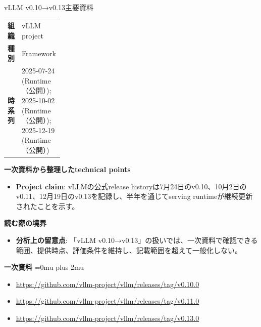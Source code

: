 \begin{technicalnote}{vLLM v0.10→v0.13}{主要資料}
\begingroup
\begin{tabularx}{\linewidth}{@{}>{\bfseries}p{0.22\linewidth}X@{}}
組織 & vLLM project \\
種別 & Framework \\
時系列 & 2025-07-24 (Runtime（公開）); 2025-10-02 (Runtime（公開）); 2025-12-19 (Runtime（公開）) \\
\end{tabularx}
\smallskip
{\bfseries 一次資料から整理したtechnical points}
\begin{itemize}[leftmargin=1.5em,itemsep=0.35em]
\item \textbf{Project claim}: vLLMの公式release historyは7月24日のv0.10、10月2日のv0.11、12月19日のv0.13を記録し、半年を通じてserving runtimeが継続更新されたことを示す。
\end{itemize}
\begin{minipage}{\linewidth}
{\bfseries 読む際の境界}
\begin{itemize}[leftmargin=1.5em,itemsep=0.35em]
\item \textbf{分析上の留意点}: 「vLLM v0.10→v0.13」の扱いでは、一次資料で確認できる範囲、提供時点、評価条件を維持し、記載範囲を超えて一般化しない。
\end{itemize}
\begin{samepage}
{\bfseries 一次資料}
\begingroup\sloppy
\Urlmuskip=0mu plus 2mu\relax
\begin{itemize}[leftmargin=1.5em,itemsep=0.25em]
\item {\scriptsize\url{https://github.com/vllm-project/vllm/releases/tag/v0.10.0}}
\item {\scriptsize\url{https://github.com/vllm-project/vllm/releases/tag/v0.11.0}}
\item {\scriptsize\url{https://github.com/vllm-project/vllm/releases/tag/v0.13.0}}
\end{itemize}
\endgroup
\end{samepage}
\end{minipage}
\endgroup
\end{technicalnote}
\medskip

